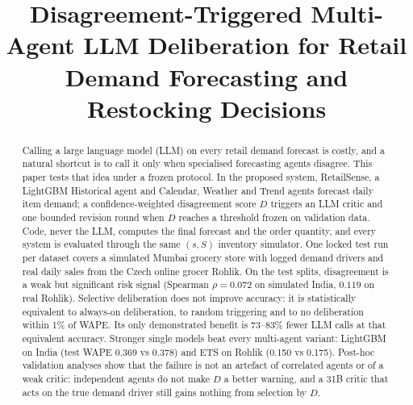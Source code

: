 \documentclass[conference]{IEEEtran}
\begin{document}
\title{Disagreement-Triggered Multi-Agent LLM Deliberation for Retail Demand Forecasting and
Restocking Decisions}

\author{
\and
{}
}

\maketitle

\begin{abstract}
Calling a large language model (LLM) on every retail demand forecast is costly, and a natural
shortcut is to call it only when specialised forecasting agents disagree. This paper tests that
idea under a frozen protocol. In the proposed system, RetailSense, a LightGBM Historical agent and
Calendar, Weather and Trend agents forecast daily item demand; a confidence-weighted disagreement
score $D$ triggers an LLM critic and one bounded revision round when $D$ reaches a threshold frozen
on validation data. Code, never the LLM, computes the final forecast and the order quantity, and
every system is evaluated through the same $(s,S)$ inventory simulator. One locked test run per
dataset covers a simulated Mumbai grocery store with logged demand drivers and real daily sales from
the Czech online grocer Rohlik. On the test splits, disagreement is a weak but significant risk
signal (Spearman $\rho=0.072$ on simulated India, $0.119$ on real Rohlik). Selective deliberation does
not improve accuracy: it is statistically equivalent to always-on deliberation, to random triggering
and to no deliberation within 1\% of WAPE. Its only demonstrated benefit is 73--83\% fewer LLM calls
at that equivalent accuracy. Stronger single models beat every multi-agent variant: LightGBM on India
(test WAPE 0.369 vs 0.378) and ETS on Rohlik (0.150 vs 0.175). Post-hoc validation analyses show that the failure is not an artefact of correlated agents
or of a weak critic: independent agents do not make $D$ a better warning, and a 31B critic that acts
on the true demand driver still gains nothing from selection by $D$.
\end{abstract}
\end{document}
